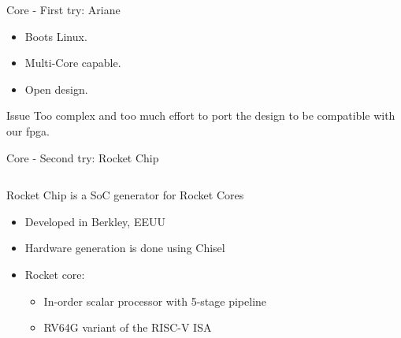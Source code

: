 \begin{frame}{Core - First try: Ariane}
    \begin{itemize}
            \item Boots Linux.
            \item Multi-Core capable.
            \item Open design.
    \end{itemize}

    \begin{alertblock}{Issue}
            Too complex and too much effort to port the design to be compatible with our \gls{fpga}.	
    \end{alertblock}
\end{frame}

\begin{frame}{Core - Second try: Rocket Chip}
\begin{columns}[T]
  \begin{column}{0.5\textwidth} %
Rocket Chip is a SoC generator for Rocket Cores
\begin{itemize}
    \item Developed in Berkley, EEUU
    \item Hardware generation is done using Chisel
    \item Rocket core: 
    \begin{itemize}
        \item In-order scalar processor with 5-stage pipeline
        \item RV64G variant of the RISC-V ISA
    \end{itemize}
\end{itemize}
\end{column}
\begin{column}{.5\textwidth} %


\end{column}
\end{columns}
\end{frame}
